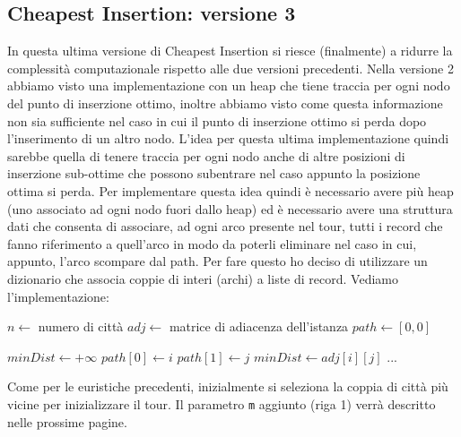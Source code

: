 \documentclass[a4paper,12pt]{report}
\begin{document}
\subsection{Cheapest Insertion: versione 3}
In questa ultima versione di Cheapest Insertion si riesce (finalmente) a ridurre la complessità computazionale rispetto alle due versioni precedenti. Nella versione 2 abbiamo visto una implementazione con un heap che tiene traccia per ogni nodo del punto di inserzione ottimo, inoltre abbiamo visto come questa informazione non sia sufficiente nel caso in cui il punto di inserzione ottimo si perda dopo l'inserimento di un altro nodo. L'idea per questa ultima implementazione quindi sarebbe quella di tenere traccia per ogni nodo anche di altre posizioni di inserzione sub-ottime che possono subentrare nel caso appunto la posizione ottima si perda. Per implementare questa idea quindi è necessario avere più heap (uno associato ad ogni nodo fuori dallo heap) ed è necessario avere una struttura dati che consenta di associare, ad ogni arco presente nel tour, tutti i record che fanno riferimento a quell'arco in modo da poterli eliminare nel caso in cui, appunto, l'arco scompare dal path. Per fare questo ho deciso di utilizzare un dizionario che associa coppie di interi (archi) a liste di record. Vediamo l'implementazione:
\begin{tcolorbox}[colframe=black, colback=white, boxrule=0.5pt, title=Cheapest Insertion Versione 3, coltitle=black, fonttitle=\bfseries, colbacktitle=white, breakable]
  \begin{algorithmic}[1]
    \State $n \gets$ numero di città
    \State $adj \gets$ matrice di adiacenza dell'istanza
    \State $path \gets [0, 0]$
    
    \State $minDist \gets +\infty$
          \State $path[0] \gets i$
          \State $path[1] \gets j$
          \State $minDist \gets adj[i][j]$
        \EndIf
      \EndFor
    \EndFor
    \State ...
  \end{algorithmic}
\end{tcolorbox}
Come per le euristiche precedenti, inizialmente si seleziona la coppia di città più vicine per inizializzare il tour. Il parametro \lstinline!m! aggiunto (riga 1) verrà descritto nelle prossime pagine.
\end{document}
